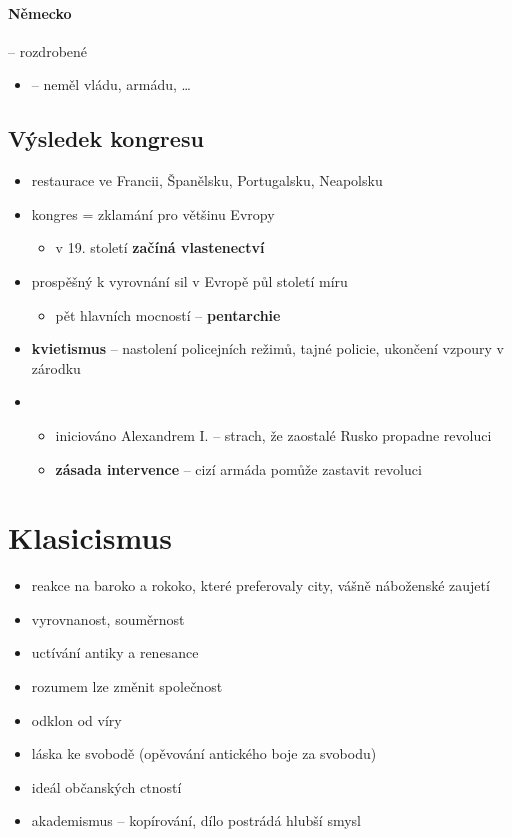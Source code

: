 \paragraph{Německo} -- rozdrobené 
\begin{itemize}
\item {} -- neměl vládu, armádu, \ldots
\end{itemize}

\subsection{Výsledek kongresu}
\begin{itemize}
\item restaurace ve Francii, Španělsku, Portugalsku, Neapolsku
\item kongres = zklamání pro většinu Evropy
	\begin{itemize}
	\item v 19. století \textbf{začíná vlastenectví}
	\end{itemize}
\item prospěšný k vyrovnání sil v Evropě \ra půl století míru
	\begin{itemize}
	\item pět hlavních mocností -- \textbf{pentarchie}
	\end{itemize}
\item \textbf{kvietismus} -- nastolení policejních režimů, tajné policie, ukončení vzpoury v zárodku
\item {}
	\begin{itemize}
	\item iniciováno Alexandrem I. -- strach, že zaostalé Rusko propadne revoluci
	\item \textbf{zásada intervence} -- cizí armáda pomůže zastavit revoluci 
	\end{itemize}
\end{itemize}






\section{Klasicismus}
\begin{itemize}
\item reakce na baroko a rokoko, které preferovaly city, vášně náboženské zaujetí
\item vyrovnanost, souměrnost
\item uctívání antiky a renesance
\item rozumem lze změnit společnost
\item odklon od víry
\item láska ke svobodě (opěvování antického boje za svobodu)
\item ideál občanských ctností 
\item akademismus -- kopírování, dílo postrádá hlubší smysl
\end{itemize}


